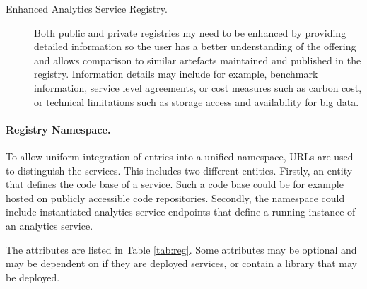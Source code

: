 \begin{description}
\item[Enhanced Analytics Service Registry.] Both public and private
  registries my need to be enhanced by providing detailed information
  so the user has a better understanding of the offering and allows
  comparison to similar artefacts maintained and published in the
  registry. Information details may include for example, benchmark
  information, service level agreements, or cost measures such as
  carbon cost, or technical limitations such as storage access and
  availability for big data.
  
\end{description}

\paragraph*{Registry Namespace.}
To allow uniform integration of entries into a unified namespace, URLs
are used to distinguish the services. This includes two different
entities. Firstly, an entity that defines the code base of a
service. Such a code base could be for example hosted on publicly
accessible code repositories. Secondly, the namespace could include
instantiated analytics service endpoints that define a running
instance of an analytics service.

The attributes are listed in Table \ref{tab:reg}. Some attributes may
be optional and may be dependent on if they are deployed services, or
contain a library that may be deployed.


